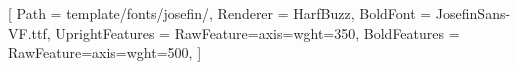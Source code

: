 
[
    Path            = template/fonts/josefin/,
    Renderer        = HarfBuzz,
    BoldFont        = JosefinSans-VF.ttf,
    UprightFeatures = {RawFeature={axis={wght=350}}},
    BoldFeatures    = {RawFeature={axis={wght=500}}},
]
\newcommand{\covertrack}[1]{\addfontfeatures{LetterSpace=#1}} %

\newcommand{\backcovertext}[2]{%
    \setlength{\parindent}{0pt}%
    \fontsize{10.5}{13.5}\selectfont
    #1\par\bigskip
    {\color{coversecondary}\coverfont\fontsize{8}{10}\selectfont\covertrack{20}ABOUT THE AUTHOR}\par\smallskip
    #2}

\newsavebox{\covertitlebox}
\newsavebox{\coverspinebox}
\newlength{\coverspinemax}
\newcommand{\spinetitlebox}[1]{%
    \sbox{\coverspinebox}{\coverfont\fontsize{#1}{#1}\selectfont\covertrack{-3}%
        \ifx\coverleadin\empty\else\coverspineleadin\ \fi\textbf{\coverspinetitle}}%
    \setlength{\coverspinemax}{0.65\dimexpr\coverpageheight mm\relax}%
    \ifdim\wd\coverspinebox>\coverspinemax \resizebox{\coverspinemax}{!}{\usebox{\coverspinebox}}\else\usebox{\coverspinebox}\fi}

